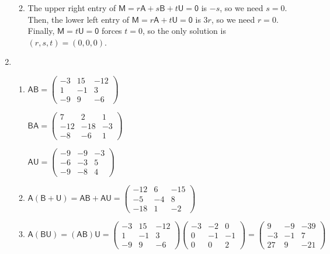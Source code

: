 \begin{enumerate}
\begin{enumerate}
\begin{equation*}
\end{equation*}
\item The upper right entry of $\mathsf{M} = r\mathsf{A} + s\mathsf{B} + t\mathsf{U} = \mathsf{0}$ is $-s$, so we need $s = 0$. Then, the lower left entry of $\mathsf{M} = r\mathsf{A} + t\mathsf{U} = \mathsf{0}$ is $3r$, so we need $r = 0$. Finally, $\mathsf{M} = t\mathsf{U} = \mathsf{0}$ forces $t = 0$, so the only solution is $(r,s,t) = (0,0,0)$.
\end{enumerate}
\newpage
\item \begin{enumerate}
\item \begin{multicols}{2}
$\mathsf{AB} = \begin{pmatrix} -3 & 15 & -12 \\ 1 & -1 & 3 \\ -9 & 9 & -6 \end{pmatrix}$\par
$\mathsf{BA} = \begin{pmatrix} 7 & 2 & 1 \\ -12 & -18 & -3 \\ -8 & -6 & 1 \end{pmatrix}$\par
$\mathsf{AU} = \begin{pmatrix} -9 & -9 & -3 \\ -6 & -3 & 5 \\ -9 & -8 & 4 \end{pmatrix}$
\end{multicols}
\item $\mathsf{A}(\mathsf{B} + \mathsf{U}) = \mathsf{AB} + \mathsf{AU} = \begin{pmatrix} -12 & 6 & -15 \\ -5 & -4 & 8 \\ -18 & 1 & -2 \end{pmatrix}$
\item $\mathsf{A}(\mathsf{BU}) = (\mathsf{AB})\mathsf{U} = \begin{pmatrix} -3 & 15 & -12 \\ 1 & -1 & 3 \\ -9 & 9 & -6 \end{pmatrix}\begin{pmatrix} -3 & -2 & 0 \\ 0 & -1 & -1 \\ 0 & 0 & 2 \end{pmatrix} = \begin{pmatrix} 9 & -9 & -39 \\ -3 & -1 & 7 \\ 27 & 9 & -21 \end{pmatrix}$

\end{enumerate}
\end{enumerate}

